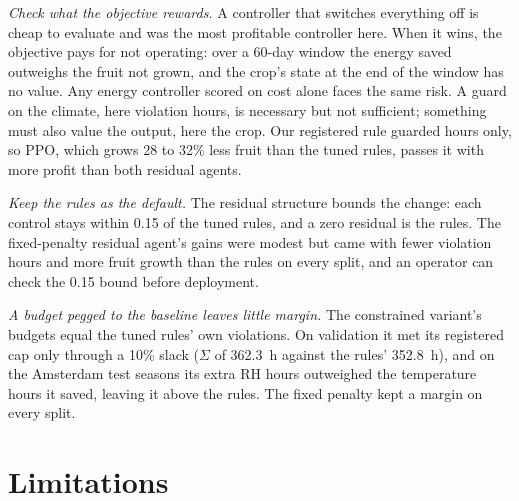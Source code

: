 \documentclass[letterpaper]{article} %
\begin{document}
\emph{Check what the objective rewards.} A controller that switches everything off is cheap to evaluate and was the most profitable controller here. When it wins, the objective pays for not operating: over a 60-day window the energy saved outweighs the fruit not grown, and the crop's state at the end of the window has no value. Any energy controller scored on cost alone faces the same risk. A guard on the climate, here violation hours, is necessary but not sufficient; something must also value the output, here the crop. Our registered rule guarded hours only, so PPO, which grows 28 to 32\% less fruit than the tuned rules, passes it with more profit than both residual agents.

\emph{Keep the rules as the default.} The residual structure bounds the change: each control stays within 0.15 of the tuned rules, and a zero residual is the rules. The fixed-penalty residual agent's gains were modest but came with fewer violation hours and more fruit growth than the rules on every split, and an operator can check the 0.15 bound before deployment.

\emph{A budget pegged to the baseline leaves little margin.} The constrained variant's budgets equal the tuned rules' own violations. On validation it met its registered cap only through a 10\% slack ($\Sigma$ of 362.3~h against the rules' 352.8~h), and on the Amsterdam test seasons its extra RH hours outweighed the temperature hours it saved, leaving it above the rules. The fixed penalty kept a margin on every split.

\section{Limitations}
\end{document}
